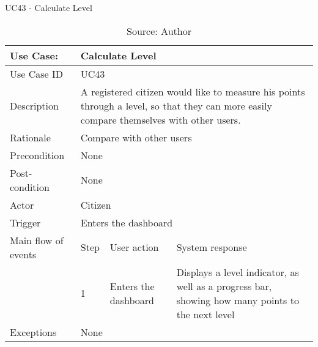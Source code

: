 \begin{table}[h]
\centering
\caption{UC43 - Calculate Level}
\label{uc:43}
\begin{tabular}{|p{3cm}|p{1cm}|p{5cm}|p{5cm}|}
\hline
Use Case:       & \multicolumn{3}{p{11cm}|}{Calculate Level} \\ \hline
Use Case ID     & \multicolumn{3}{p{11cm}|}{UC43} \\ \hline
Description     & \multicolumn{3}{p{11cm}|}{A registered citizen would like to measure his points through a level, so that they can more easily compare themselves with other users.} \\ \hline
Rationale       & \multicolumn{3}{p{11cm}|}{Compare with other users} \\ \hline
Precondition    & \multicolumn{3}{p{11cm}|}{None} \\ \hline
Post-condition  & \multicolumn{3}{p{11cm}|}{None} \\ \hline
Actor           & \multicolumn{3}{p{11cm}|}{Citizen} \\ \hline
Trigger         & \multicolumn{3}{p{11cm}|}{Enters the dashboard} \\ \hline
Main flow of events & Step  & User action & System response \\ \hline
                    & 1     & Enters the dashboard & Displays a level indicator, as well as a progress bar, showing how many points to the next level \\ \hline
Exceptions      & \multicolumn{3}{p{11cm}|}{None} \\ \hline
\end{tabular}
\caption*{Source: Author}
\end{table}

